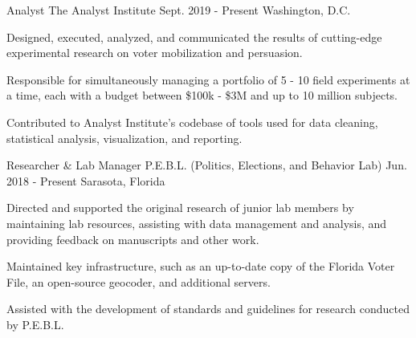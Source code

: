

\begin{cventries}

    \cventry
      {Analyst} %
      {The Analyst Institute} %
      {Sept. 2019 - Present} %
      {Washington, D.C.} %
      {
        \begin{cvitems} %
          \item {Designed, executed, analyzed, and communicated the results of cutting-edge experimental research on voter mobilization and persuasion.}
          \item {Responsible for simultaneously managing a portfolio of 5 - 10 field experiments at a time, each with a budget between \$100k - \$3M and up to 10 million subjects.}
          \item {Contributed to Analyst Institute's codebase of tools used for data cleaning, statistical analysis, visualization, and reporting.}
      \end{cvitems}
      }


    \cventry
      {Researcher \& Lab Manager} %
      {P.E.B.L. (Politics, Elections, and Behavior Lab)} %
      {Jun. 2018 - Present} %
      {Sarasota, Florida} %
      {
        \begin{cvitems} %
          \item {Directed and supported the original research of junior lab members by maintaining lab resources, assisting with data management and analysis, and providing feedback on manuscripts and other work.}
          \item {Maintained key infrastructure, such as an up-to-date copy of the Florida Voter File, an open-source geocoder, and additional servers.}
          \item {Assisted with the development of standards and guidelines for research conducted by P.E.B.L.}
      \end{cvitems}
      }


\end{cventries}
